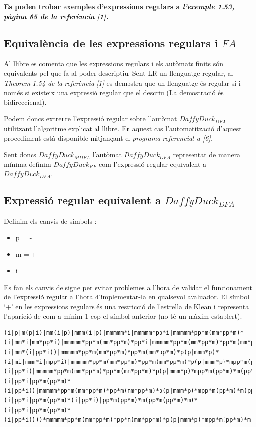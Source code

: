 \documentclass[12pt,a4paper]{report}
\def \dfa{$DaffyDuck_{DFA} $}
\def \mfa{$DaffyDuck_{MDFA} $}
\def \re{$DaffyDuck_{RE} $}
\begin{document}
\textbf{Es poden trobar exemples d’expressions regulars a \textit{l’exemple 1.53, pàgina 65 de la referència [1].}}

\subsection{Equivalència de les expressions regulars i $FA$}

Al llibre es comenta que les expressions regulars i els autòmats finits són equivalents pel que fa al poder descriptiu. Sent LR un llenguatge regular, al \textit{Theorem 1.54 de la referència [1]} es demostra que un llenguatge és regular si i només si existeix una expressió regular que el descriu (La demostració és bidireccional).

Podem doncs extreure l’expressió regular sobre l’autòmat \dfa{} utilitzant l’algoritme explicat al llibre. En aquest cas l’automatització d’aquest procediment està disponible mitjançant el \textit{programa referenciat a [6].}

Sent doncs \mfa{} l’autòmat \dfa{} representat de manera mínima definim \re{} com l’expressió regular equivalent a \dfa{}.

\subsection{Expressió regular equivalent a \dfa{}}

Definim els canvis de símbols :

\begin{itemize}
\item p = -
\item m = +
\item i = \Return
\end{itemize}

Es fan els canvis de signe per evitar problemes a l’hora de validar el funcionament de l’expressió regular a l’hora d’implementar-la en qualsevol avaluador. El símbol ‘+’ en les expressions regulars és una restricció de l’estrella de Klean i representa l’aparició de com a mínim 1 cop el símbol anterior (no té un màxim establert).


\begin{lstlisting}
(i|p|m(p|i)|mm(i|p)|mmm(i|p)|mmmmm*i|mmmmm*pp*i|mmmmm*pp*m(mm*pp*m)*(i|mm*i|mm*pp*i)|mmmmm*pp*m(mm*pp*m)*pp*i|mmmmm*pp*m(mm*pp*m)*pp*m(mm*pp*m)*(i|mm*(i|pp*i))|mmmmm*pp*m(mm*pp*m)*pp*m(mm*pp*m)*p(p|mmm*p)*(i|mi|mmm*i|mpp*i)|mmmmm*pp*m(mm*pp*m)*pp*m(mm*pp*m)*p(p|mmm*p)*mpp*m(pp*m)*(i|pp*i)|mmmmm*pp*m(mm*pp*m)*pp*m(mm*pp*m)*p(p|mmm*p)*mpp*m(pp*m)*m(pp*m(pp*m)*m)*(i|pp*i|pp*m(pp*m)*(i|pp*i))|mmmmm*pp*m(mm*pp*m)*pp*m(mm*pp*m)*p(p|mmm*p)*mpp*m(pp*m)*m(pp*m(pp*m)*m)*m(pp*m(pp*m)*m(pp*m(pp*m)*m)*m)*(i|pp*i|pp*m(pp*m)*(i|pp*i)|pp*m(pp*m)*m(pp*m(pp*m)*m)*(i|pp*i|pp*m(pp*m)*(i|pp*i))))*mmmmm*pp*m(mm*pp*m)*pp*m(mm*pp*m)*p(p|mmm*p)*mpp*m(pp*m)*m(pp*m(pp*m)*m)*m(pp*m(pp*m)*m(pp*m(pp*m)*m)*m)*m(i|m|p)*
\end{lstlisting}
\end{document}

